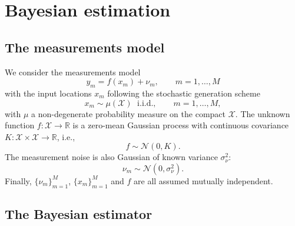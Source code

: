 \documentclass[10pt,twocolumn,twoside]{IEEEtran}					%
\theoremstyle	{plain}
\newcommand{\GaussianDistribution}					[2]	{\mathcal{N} \left( #1, #2 \right)}
\newcommand{\Reals}									[0]	{\mathbb{R}}
\begin{document}
\section{Bayesian estimation}
\label{sec:the_bayesian_estimation_problem}

\subsection{The measurements model}
\label{ssec:measurements_model}

We consider the measurements model 
%
\begin{equation}
	y_{m} = f \left( x_{m} \right) + \nu_{m},
	\qquad
	m = 1, \ldots, M
	\label{equ:measurement_model}
\end{equation}
%
with the input locations $x_{m}$ following the stochastic generation scheme
%
\begin{equation}
	x_{m} \sim \mu(\mathcal{X}) \; \text{ i.i.d.},
	\qquad
	m = 1, \ldots, M,
	\label{equ:input_locations_model}
\end{equation}
%
with $\mu$ a non-degenerate probability measure on the compact $\mathcal{X}$. The unknown function $f: \mathcal{X} \rightarrow \Reals$ is a zero-mean Gaussian process with continuous covariance $K: \mathcal{X} \times \mathcal{X} \rightarrow \Reals$, i.e.,
%
\begin{equation}
	f \sim \GaussianDistribution{0}{K}.
	\label{equ:distribution_of_the_estimand}
\end{equation}
%
The measurement noise is also Gaussian of known variance $\sigma^{2}_{\nu}$:
%
\begin{equation}
	\nu_{m} \sim \GaussianDistribution{0}{\sigma^{2}_{\nu}}.
\end{equation}
%
Finally, $\{ \nu_{m} \}_{m=1}^M$, $\{ x_{m} \}_{m=1}^M$ and $f$ are all assumed mutually independent. 



\subsection{The Bayesian estimator}
\label{ssec:the_bayesian_estimator}
\end{document}
